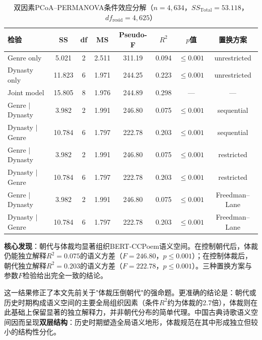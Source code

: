\documentclass[12pt,a4paper]{article}
\numberwithin{equation}{section}
\begin{document}
\begin{table}[htbp]
  \centering
  \caption{双因素PCoA--PERMANOVA条件效应分解（$n=4,634$，$SS_{\text{Total}}=53.118$，$df_{\text{resid}}=4,625$）}
  \label{tab:two-factor-permanova}
  \footnotesize
  \begin{tabular}{lccccccc}
    \toprule
    检验                                 & SS      & df  & MS    & Pseudo-F & $R^{2}$ & $p$值     & 置换方案 \\
    \midrule
    Genre only                           & 5.021   & 2   & 2.511 & 311.19   & 0.094   & $\leq0.001$  & unrestricted \\
    Dynasty only                         & 11.823  & 6   & 1.971 & 244.25   & 0.223   & $\leq0.001$  & unrestricted \\
    Joint model                          & 15.805  & 8   & 1.976 & 244.89   & 0.298   & ---       & --- \\
    \midrule
    Genre $\mid$ Dynasty                 & 3.982   & 2   & 1.991 & 246.80   & 0.075   & $\leq0.001$  & sequential \\
    Dynasty $\mid$ Genre                 & 10.784  & 6   & 1.797 & 222.78   & 0.203   & $\leq0.001$  & sequential \\
    Genre $\mid$ Dynasty                 & 3.982   & 2   & 1.991 & 246.80   & 0.075   & $\leq0.001$  & restricted \\
    Dynasty $\mid$ Genre                 & 10.784  & 6   & 1.797 & 222.78   & 0.203   & $\leq0.001$  & restricted \\
    Genre $\mid$ Dynasty                 & 3.982   & 2   & 1.991 & 246.80   & 0.075   & $\leq0.001$  & Freedman--Lane \\
    Dynasty $\mid$ Genre                 & 10.784  & 6   & 1.797 & 222.78   & 0.203   & $\leq0.001$  & Freedman--Lane \\
    \bottomrule
  \end{tabular}
\end{table}

\textbf{核心发现}：朝代与体裁均显著组织BERT-CCPoem语义空间。在控制朝代后，体裁仍能独立解释$R^{2}=0.075$的语义方差（$F=246.80$，$p\leq0.001$）；在控制体裁后，朝代独立解释$R^{2}=0.203$的语义方差（$F=222.78$，$p\leq0.001$）。三种置换方案与参数$F$检验给出完全一致的结论。

这一结果修正了本文先前关于"体裁压倒朝代"的强命题。更准确的结论是：朝代或历史时期构成语义空间的主要全局组织因素（条件$R^{2}$约为体裁的2.7倍），体裁则在此基础上保留显著的独立解释力，并非朝代分布的简单代理。中国古典诗歌语义空间因而呈现\textbf{双层结构}：历史时期塑造全局语义地形，体裁规范在其中形成独立但较小的结构性分化。
\end{document}
